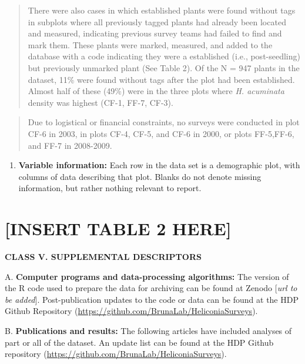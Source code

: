 \documentclass[
  12pt,
  man, donotrepeattitle]{apa6}
\providecommand{\tightlist}{%
  \setlength{\itemsep}{0pt}\setlength{\parskip}{0pt}}
\begin{document}
\begin{quote}
There were also cases in which established plants were found without tags in subplots where all previously tagged plants had already been located and measured, indicating previous survey teams had failed to find and mark them. These plants were marked, measured, and added to the database with a code indicating they were a established (i.e., post-seedling) but previously unmarked plant (See Table 2). Of the N = 947 plants in the dataset, 11\% were found without tags after the plot had been established. Almost half of these (49\%) were in the three plots where \emph{H. acuminata} density was highest (CF-1, FF-7, CF-3).
\end{quote}

\begin{quote}
Due to logistical or financial constraints, no surveys were conducted in plot CF-6 in 2003, in plots CF-4, CF-5, and CF-6 in 2000, or plots FF-5,FF-6, and FF-7 in 2008-2009.
\end{quote}

\begin{enumerate}
\def\labelenumi{\arabic{enumi}.}
\setcounter{enumi}{7}
\tightlist
\item
  \textbf{Variable information:} Each row in the data set is a demographic plot, with columns of data describing that plot. Blanks do not denote missing information, but rather nothing relevant to report.
\end{enumerate}

\hypertarget{insert-table-2-here}{%
\section{{[}INSERT TABLE 2 HERE{]}}\label{insert-table-2-here}}

\noindent
\textbf{CLASS V. SUPPLEMENTAL DESCRIPTORS}

\noindent  
A. \textbf{Computer programs and data-processing algorithms:} The version of the R code used to prepare the data for archiving can be found at Zenodo {[}\emph{url to be added}{]}. Post-publication updates to the code or data can be found at the HDP Github Repository (\url{https://github.com/BrunaLab/HeliconiaSurveys}).

\noindent  
B. \textbf{Publications and results:} The following articles have included analyses of part or all of the dataset. An update list can be found at the HDP Github repository (\url{https://github.com/BrunaLab/HeliconiaSurveys}).
\end{document}

